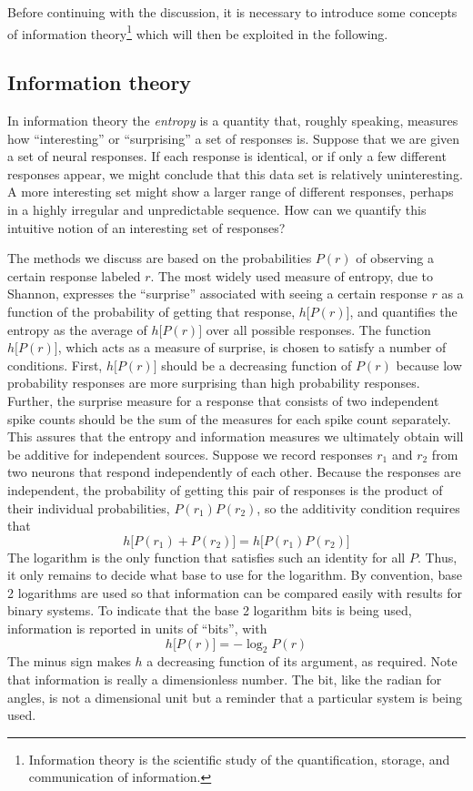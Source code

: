 Before continuing with the discussion, it is necessary to introduce some concepts of information theory\footnote{Information theory is the scientific study of the quantification, storage, and communication of information.} which will then be exploited in the following.
\subsection{Information theory}
In information theory the \emph{entropy} is a quantity that, roughly speaking, measures how ``interesting'' or ``surprising'' a set of responses is. Suppose that we are given a set of neural responses. If each response is identical, or if only a few different responses appear, we might conclude that this data set is relatively uninteresting. A more interesting set might show a larger range of different responses, perhaps in a highly irregular and unpredictable sequence. How can we quantify this intuitive notion of an interesting set of responses?

The methods we discuss are based on the probabilities $P(r)$ of observing a certain response labeled $r$. The most widely used measure of entropy, due to Shannon, expresses the ``surprise'' associated with seeing a certain response $r$ as a function of the probability of getting that response, $h\bigl[P(r)\bigr]$, and quantifies the entropy as the average of $h\bigl[P(r)\bigr]$ over all possible responses. The function $h\bigl[P(r)\bigr]$, which acts as a measure of surprise, is chosen to satisfy a number of conditions. First, $h\bigl[P(r)\bigr]$ should be a decreasing function of $P(r)$ because low probability responses are more surprising than high probability responses. Further, the surprise measure for a response that consists of two independent spike counts should be the sum of the measures for each spike count separately. This assures that the entropy and information measures we ultimately obtain will be additive for independent sources. Suppose we record responses $r_1$ and $r_2$ from two neurons that respond independently of each other. Because the responses are independent, the probability of getting this pair of responses is the product of their individual probabilities, $P(r_1)P(r_2)$, so the additivity condition requires that
\begin{equation}
h\bigl[P(r_1)+P(r_2)\bigr]=h\bigl[P(r_1)P(r_2)\bigr]
\end{equation}
The logarithm is the only function that satisfies such an identity for all $P$. Thus, it only remains to decide what base to use for the logarithm. By convention, base 2 logarithms are used so that information can be compared
easily with results for binary systems. To indicate that the base 2 logarithm bits is being used, information is reported in units of ``bits'', with
\begin{equation}\label{surprise}
h\bigl[P(r)\bigr]=-\log_{2}P(r)
\end{equation}
The minus sign makes $h$ a decreasing function of its argument, as required. Note that information is really a dimensionless number. The bit, like the radian for angles, is not a dimensional unit but a reminder that a particular
system is being used.

